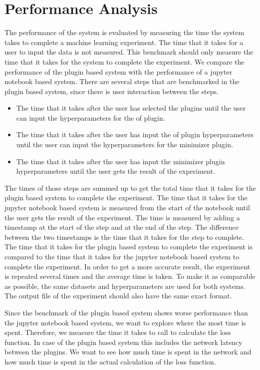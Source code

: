 \documentclass[
  a4paper,  %
  twoside,  %
  bibliography=totoc,
  headsepline,
  cleardoublepage=empty,
  parskip=half,
  draft=false
]{scrbook}
\begin{document}
\section{Performance Analysis}
\label{sec:performanceAnalysis}

The performance of the system is evaluated by measuring the time the system takes to complete a machine learning experiment.
The time that it takes for a user to input the data is not measured.
This benchmark should only measure the time that it takes for the system to complete the experiment.
We compare the performance of the plugin based system with the performance of a jupyter notebook based system.
There are several steps that are benchmarked in the plugin based system, since there is user interaction between the steps.
\begin{itemize}
  \item The time that it takes after the user has selected the plugins until the user can input the hyperparameters for the of plugin.
  \item The time that it takes after the user has input the of plugin hyperparameters until the user can input the hyperparameters for the minimizer plugin.
  \item The time that it takes after the user has input the minimizer plugin hyperparameters until the user gets the result of the experiment.
\end{itemize}
The times of those steps are summed up to get the total time that it takes for the plugin based system to complete the experiment.
The time that it takes for the jupyter notebook based system is measured from the start of the notebook until the user gets the result of the experiment.
The time is measured by adding a timestamp at the start of the step and at the end of the step.
The difference between the two timestamps is the time that it takes for the step to complete.
The time that it takes for the plugin based system to complete the experiment is compared to the time that it takes for the jupyter notebook based system to complete the experiment.
In order to get a more accurate result, the experiment is repeated several times and the average time is taken.
To make it as comparable as possible, the same datasets and hyperparameters are used for both systems.
The output file of the experiment should also have the same exact format.

Since the benchmark of the plugin based system shows worse performance than the jupyter notebook based system, we want to explore where the most time is spent.
Therefore, we measure the time it takes to call to calculate the loss function.
In case of the plugin based system this includes the network latency between the plugins.
We want to see how much time is spent in the network and how much time is spent in the actual calculation of the loss function.
\end{document}
